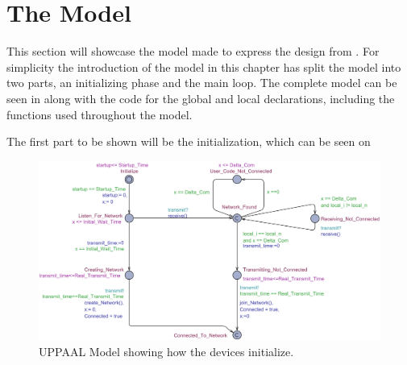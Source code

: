 \section{The Model}
This section will showcase the model made to express the design from .
For simplicity the introduction of the model in this chapter has split the model into two parts, an initializing phase and the main loop.
The complete model can be seen in  along with the code for the global and local declarations, including the functions used throughout the model.

The first part to be shown will be the initialization, which can be seen on 

\begin{figure}
  \includegraphics[width=1\textwidth]{Figures/Model/Device_Connecting.pdf} 
\caption{UPPAAL Model showing how the devices initialize.}
\label{fig:UPPAAL_Intitialization}
\end{figure}

